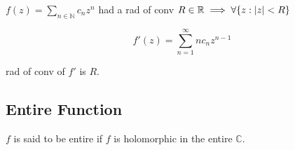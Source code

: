 $f(z) = \sum_{n \in \mathbb{N}} c_n z^n $ had a rad of conv $R \in \mathbb{R} \implies \forall \{z : \left|z\right| < R\}$

\begin{equation*}
	f'(z) = \sum_{n=1}^{\infty} nc_n z^{n - 1}
\end{equation*}

rad of conv of $f'$ is $R$.


\subsection{Entire Function} %
\label{sub:entire_function}
$f$ is said to be entire if $f$ is holomorphic in the entire $\mathbb{C}$.

